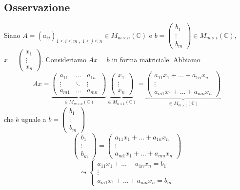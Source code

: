 \documentclass[a4paper]{article}
\theoremstyle{break}
\theoremstyle{break}
\theoremstyle{break}
\theoremstyle{break}
\begin{document}
\subsection{Osservazione}
Siano \( A = (a_{ij})_{1 \le i \le m\;,\;1 \le j \le n} \in M_{m \times n}(\mathbb{C}) \) e
\( b = \begin{pmatrix} b_1 \\ \vdots \\ b_m \end{pmatrix} \in M_{m \times i}(\mathbb{C}) \),
\( x = \begin{pmatrix} x_1 \\ \vdots \\ x_n \end{pmatrix}  \).
Consideriamo \( Ax=b \) in forma matriciale. Abbiamo
\[
  Ax = \underbrace{\begin{pmatrix} 
      a_{11} & \ldots & a_{1n}\\
      \vdots & \ddots & \vdots\\
      a_{m1} & \ldots & a_{mn}
  \end{pmatrix}}_{\in M_{m \times n}(\mathbb{C})}
  \underbrace{\begin{pmatrix} 
      x_1\\
      \vdots\\
      x_n
  \end{pmatrix}}_{\in M_{n \times 1}(\mathbb{C})}
  =
  \underbrace{\begin{pmatrix} 
      a_{11}x_1 + \ldots + a_{1n}x_n\\
      \vdots\\
      a_{m1}x_1 + \ldots + a_{mn}x_n
  \end{pmatrix}}_{\in M_{m \times 1}(\mathbb{C})}
\]
che è uguale a \( b = \begin{pmatrix} b_1 \\ \vdots \\ b_m \end{pmatrix}  \) 
\[
  \begin{pmatrix} 
    b_1\\
    \vdots\\
    b_m
  \end{pmatrix} 
  =
  \begin{pmatrix} 
    a_{11}x_1 + \ldots + a_{1n}x_n\\
    \vdots\\
    a_{m1}x_1 + \ldots + a_{mn}x_n
  \end{pmatrix} 
\] 
\[
  \leadsto \begin{cases}
    a_{11}x_1 + \ldots + a_{1n}x_n = b_1\\
    \vdots\\
    a_{m1}x_1 + \ldots + a_{mn}x_n = b_m
  \end{cases}
\] 
\end{document}
